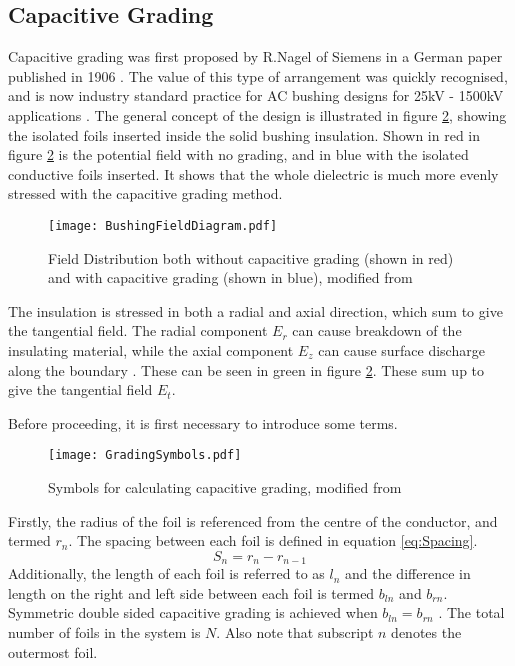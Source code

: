 \subsection{Capacitive Grading} \label{ss:CapacitiveGrading}
Capacitive grading was first proposed by R.Nagel of Siemens in a German paper published in 1906 \cite{harlow2004electric}.
The value of this type of arrangement was quickly recognised, and is now industry standard practice for AC bushing designs for 25kV - 1500kV applications \cite{james2008condition}.
The general concept of the design is illustrated in figure \ref{figure:fieldgeneric}, showing the isolated foils inserted inside the solid bushing insulation.
Shown in red in figure \ref{figure:fieldgeneric} is the potential field with no grading, and in blue with the isolated conductive foils inserted.
It shows that the whole dielectric is much more evenly stressed with the capacitive grading method.
\begin{figure}[!h]
   \centering
   \texttt{[image: BushingFieldDiagram.pdf]}
   \caption{Field Distribution both without capacitive grading (shown in red) and with capacitive grading (shown in blue), modified from \cite{james2008condition}}
   \label{figure:fieldgeneric}
\end{figure}

The insulation is stressed in both a radial and axial direction, which sum to give the tangential field.
The radial component $E_r$ can cause breakdown of the insulating material, while the axial component $E_z$ can cause surface discharge along the boundary \cite{Ahmed11}.
These can be seen in green in figure \ref{figure:fieldgeneric}.
These sum up to give the tangential field $E_t$.

Before proceeding, it is first necessary to introduce some terms.
\begin{figure}[!h]
   \centering
   \texttt{[image: GradingSymbols.pdf]}
   \caption{Symbols for calculating capacitive grading, modified from \cite{Ahmed11}}
   \label{figure:fieldgeneric}
\end{figure}
Firstly, the radius of the foil is referenced from the centre of the conductor, and termed $r_n$. 
The spacing between each foil is defined in equation \ref{eq:Spacing}.
\begin{equation}
   \label{eq:Spacing}
   S_n = r_n - r_{n-1}
\end{equation}
Additionally, the length of each foil is referred to as $l_n$ and the difference in length on the right and left side between each foil is termed $b_{ln}$ and $b_{rn}$. 
Symmetric double sided capacitive grading is achieved when $b_{ln}=b_{rn}$ \cite{Ahmed11}. 
The total number of foils in the system is $N$.
Also note that subscript $n$ denotes the outermost foil.

